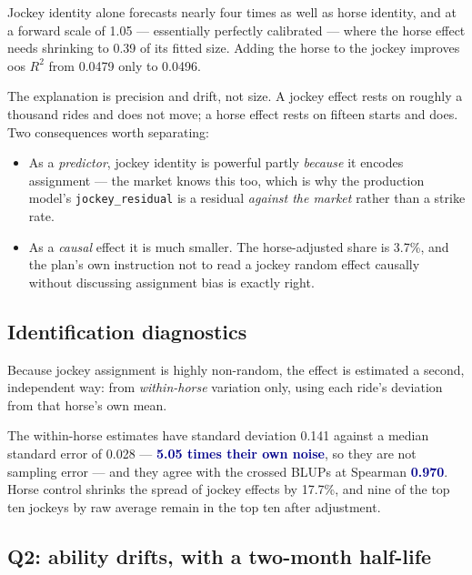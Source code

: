 \documentclass[11pt,a4paper]{article}
\newcommand{\good}[1]{\textcolor{darkblue}{\textbf{#1}}}
\begin{document}
Jockey identity alone forecasts nearly four times as well as horse identity, and
at a forward scale of 1.05 --- essentially perfectly calibrated --- where the horse
effect needs shrinking to 0.39 of its fitted size. Adding the horse to the jockey
improves oos $R^2$ from 0.0479 only to 0.0496.

The explanation is precision and drift, not size. A jockey effect rests on roughly
a thousand rides and does not move; a horse effect rests on fifteen starts and
does. Two consequences worth separating:

\begin{itemize}\itemsep2pt
\item As a \emph{predictor}, jockey identity is powerful partly \emph{because} it
encodes assignment --- the market knows this too, which is why the production
model's \texttt{jockey\_residual} is a residual \emph{against the market} rather
than a strike rate.
\item As a \emph{causal} effect it is much smaller. The horse-adjusted share is
3.7\%, and the plan's own instruction not to read a jockey random effect causally
without discussing assignment bias is exactly right.
\end{itemize}

\subsection{Identification diagnostics}

Because jockey assignment is highly non-random, the effect is estimated a second,
independent way: from \emph{within-horse} variation only, using each ride's
deviation from that horse's own mean.

The within-horse estimates have standard deviation 0.141 against a median standard
error of 0.028 --- \good{5.05 times their own noise}, so they are not sampling
error --- and they agree with the crossed BLUPs at Spearman \good{0.970}. Horse
control shrinks the spread of jockey effects by 17.7\%, and nine of the top ten
jockeys by raw average remain in the top ten after adjustment.

\subsection{Q2: ability drifts, with a two-month half-life}
\end{document}
